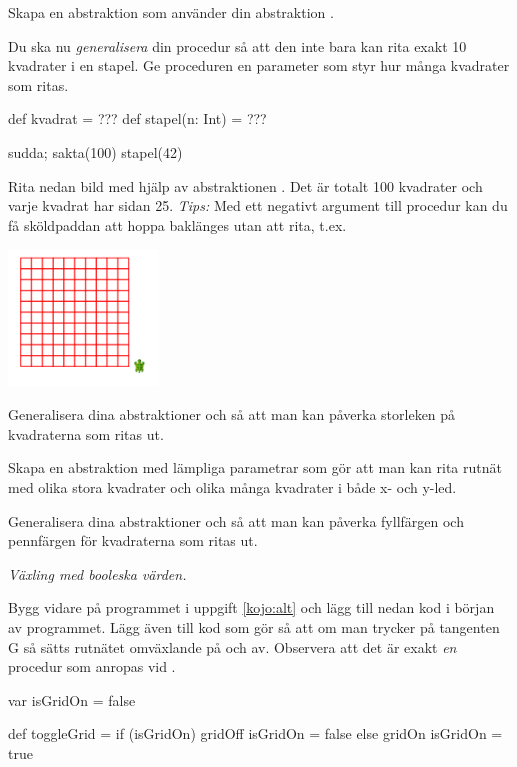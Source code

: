 \Subtask Skapa en abstraktion  som använder din abstraktion .

\Subtask Du ska nu \emph{generalisera} din procedur så att den inte bara kan rita exakt 10 kvadrater i en stapel. Ge proceduren  en parameter  som styr hur många kvadrater som ritas.
\begin{Code}
def kvadrat = ???
def stapel(n: Int) = ???

sudda; sakta(100)
stapel(42)
\end{Code}



\Subtask Rita nedan bild med hjälp av abstraktionen . Det är totalt 100 kvadrater och varje kvadrat har sidan 25. \emph{Tips:} Med ett negativt argument till procedur  kan du få sköldpaddan att hoppa baklänges utan att rita, t.ex. 

\includegraphics[width=0.3\textwidth]{../img/kojo/square-grid}

\Subtask Generalisera dina abstraktioner  och  så att man kan påverka storleken på kvadraterna som ritas ut.

\Subtask Skapa en abstraktion  med lämpliga parametrar som gör att man kan rita rutnät med olika stora kvadrater och olika många kvadrater i både x- och y-led.

\Subtask Generalisera dina abstraktioner  och  så att man kan påverka fyllfärgen och pennfärgen för kvadraterna som ritas ut.

\Task \emph{Växling med booleska värden.}

\Subtask Bygg vidare på programmet i uppgift \ref{kojo:alt} och lägg till nedan kod i början av programmet. Lägg även till kod som gör så att om man trycker på tangenten G så sätts rutnätet omväxlande på och av. Observera att det är exakt \emph{en} procedur som anropas vid .

\begin{Code}
var isGridOn = false

def toggleGrid =
  if (isGridOn) {
    gridOff
    isGridOn = false
  } else {
    gridOn
    isGridOn = true
  }
\end{Code}

